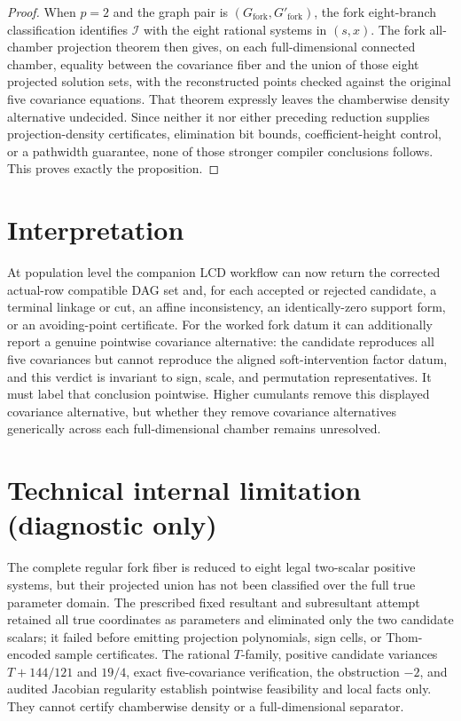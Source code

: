 \documentclass{article}
\begin{document}
\begin{proof}
When \(p=2\) and the graph pair is \((G_{\mathrm{fork}},G'_{\mathrm{fork}})\), the fork eight-branch classification identifies \(\mathcal I\) with the eight rational systems in \((s,x)\).  The fork all-chamber projection theorem then gives, on each full-dimensional connected chamber, equality between the covariance fiber and the union of those eight projected solution sets, with the reconstructed points checked against the original five covariance equations.  That theorem expressly leaves the chamberwise density alternative undecided.  Since neither it nor either preceding reduction supplies projection-density certificates, elimination bit bounds, coefficient-height control, or a pathwidth guarantee, none of those stronger compiler conclusions follows.  This proves exactly the proposition.
\end{proof}

\section{Interpretation}

At population level the companion LCD workflow can now return the corrected actual-row compatible DAG set and, for each accepted or rejected candidate, a terminal linkage or cut, an affine inconsistency, an identically-zero support form, or an avoiding-point certificate. For the worked fork datum it can additionally report a genuine pointwise covariance alternative: the candidate reproduces all five covariances but cannot reproduce the aligned soft-intervention factor datum, and this verdict is invariant to sign, scale, and permutation representatives. It must label that conclusion pointwise. Higher cumulants remove this displayed covariance alternative, but whether they remove covariance alternatives generically across each full-dimensional chamber remains unresolved.

\section*{Technical internal limitation (diagnostic only)}

The complete regular fork fiber is reduced to eight legal two-scalar positive systems, but their projected union has not been classified over the full true parameter domain. The prescribed fixed resultant and subresultant attempt retained all true coordinates as parameters and eliminated only the two candidate scalars; it failed before emitting projection polynomials, sign cells, or Thom-encoded sample certificates. The rational \(T\)-family, positive candidate variances \(T+144/121\) and \(19/4\), exact five-covariance verification, the obstruction \(-2\), and audited Jacobian regularity establish pointwise feasibility and local facts only. They cannot certify chamberwise density or a full-dimensional separator.
\end{document}
